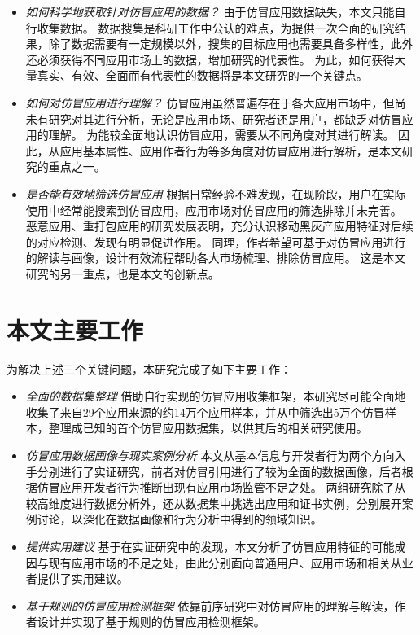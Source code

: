\begin{itemize}
	\setlength{\itemsep}{1pt}
	      \setlength{\parskip}{0pt}
	      \setlength{\parsep}{0pt}
	\item \emph{如何科学地获取针对仿冒应用的数据？} \quad
	      由于仿冒应用数据缺失，本文只能自行收集数据。
	      数据搜集是科研工作中公认的难点，为提供一次全面的研究结果，除了数据需要有一定规模以外，搜集的目标应用也需要具备多样性，此外还必须获得不同应用市场上的数据，增加研究的代表性。
	      为此，如何获得大量真实、有效、全面而有代表性的数据将是本文研究的一个关键点。

	\item \emph{如何对仿冒应用进行理解？} \quad
	      仿冒应用虽然普遍存在于各大应用市场中，但尚未有研究对其进行分析，无论是应用市场、研究者还是用户，都缺乏对仿冒应用的理解。
	      为能较全面地认识仿冒应用，需要从不同角度对其进行解读。
	      因此，从应用基本属性、应用作者行为等多角度对仿冒应用进行解析，是本文研究的重点之一。

	\item \emph{是否能有效地筛选仿冒应用} \quad
	      根据日常经验不难发现，在现阶段，用户在实际使用中经常能搜索到仿冒应用，应用市场对仿冒应用的筛选排除并未完善。
	      恶意应用、重打包应用的研究发展表明，充分认识移动黑灰产应用特征对后续的对应检测、发现有明显促进作用。
	      同理，作者希望可基于对仿冒应用进行的解读与画像，设计有效流程帮助各大市场梳理、排除仿冒应用。
	      这是本文研究的另一重点，也是本文的创新点。
\end{itemize}

\section{本文主要工作}
为解决上述三个关键问题，本研究完成了如下主要工作：

\begin{itemize}
	\setlength{\itemsep}{1pt}
	      \setlength{\parskip}{0pt}
	      \setlength{\parsep}{0pt}
	\item \emph{全面的数据集整理} \quad
	      借助自行实现的仿冒应用收集框架，本研究尽可能全面地收集了来自29个应用来源的约14万个应用样本，并从中筛选出5万个仿冒样本，整理成已知的首个仿冒应用数据集，以供其后的相关研究使用。

	\item \emph{仿冒应用数据画像与现实案例分析} \quad
	      本文从基本信息与开发者行为两个方向入手分别进行了实证研究，前者对仿冒引用进行了较为全面的数据画像，后者根据仿冒应用开发者行为推断出现有应用市场监管不足之处。
	      两组研究除了从较高维度进行数据分析外，还从数据集中挑选出应用和证书实例，分别展开案例讨论，以深化在数据画像和行为分析中得到的领域知识。

	\item \emph{提供实用建议} \quad
	      基于在实证研究中的发现，本文分析了仿冒应用特征的可能成因与现有应用市场的不足之处，由此分别面向普通用户、应用市场和相关从业者提供了实用建议。

	\item \emph{基于规则的仿冒应用检测框架} \quad
	      依靠前序研究中对仿冒应用的理解与解读，作者设计并实现了基于规则的仿冒应用检测框架\mytool 。

\end{itemize}

